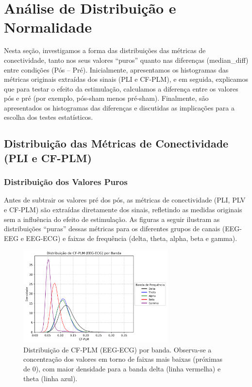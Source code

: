 \chapter{Análise de Distribuição e Normalidade}
\label{chap:analise_distribuicao_normalidade}

Nesta seção, investigamos a forma das distribuições das métricas de conectividade, tanto nos seus valores “puros” quanto nas diferenças (median\_diff) entre condições (Pós – Pré). Inicialmente, apresentamos os histogramas das métricas originais extraídas dos sinais (PLI e CF-PLM), e em seguida, explicamos que para testar o efeito da estimulação, calculamos a diferença entre os valores pós e pré (por exemplo, pós‐sham menos pré‐sham). Finalmente, são apresentados os histogramas das diferenças e discutidas as implicações para a escolha dos testes estatísticos.

\section{Distribuição das Métricas de Conectividade (PLI e CF-PLM)}

\subsection{Distribuição dos Valores Puros}
Antes de subtrair os valores pré dos pós, as métricas de conectividade (PLI, PLV e CF-PLM) são extraídas diretamente dos sinais, refletindo as medidas originais sem a influência do efeito de estimulação. As figuras a seguir ilustram as distribuições “puras” dessas métricas para os diferentes grupos de canais (EEG-EEG e EEG-ECG) e faixas de frequência (delta, theta, alpha, beta e gamma).

\begin{figure}[htb]
    \centering
    \includegraphics[width=0.7\textwidth]{figs/3_1_connectivity_metrics/Distribuição_de_CF-PLM_(EEG-ECG)_por_Banda.png}
    \caption{Distribuição de CF-PLM (EEG-ECG) por banda. Observa-se a concentração dos valores em torno de faixas mais baixas (próximas de 0), com maior densidade para a banda delta (linha vermelha) e theta (linha azul).}
    \label{fig:cfplm_eeg_ecg}
\end{figure}

